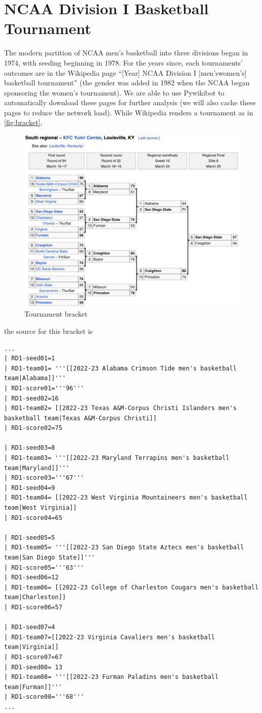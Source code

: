\documentclass{article}
\begin{document}
\section{NCAA Division I Basketball Tournament}
The modern partition of NCAA men's basketball into three divisions began in 1974, with seeding beginning in 1978.  For the years since, each tournaments' outcomes are in the Wikipedia page ``[Year] NCAA Division I [men's\textbar women's] basketball tournament'' (the gender was added in 1982 when the NCAA began sponsoring the women's tournament).  We are able to use Pywikibot\cite{pywikibot} to automatically download these pages for further analysis (we will also cache these pages to reduce the network load).  While Wikipedia renders a tournament as in \autoref{fig:bracket},
\begin{figure}
\includegraphics[width=\linewidth]{2023bracket}
\caption{\label{fig:bracket}Tournament bracket}
\end{figure}
the source for this bracket is
\begin{lstlisting}[basicstyle=\scriptsize,breaklines=true]
...
| RD1-seed01=1
| RD1-team01= '''[[2022-23 Alabama Crimson Tide men's basketball team|Alabama]]'''
| RD1-score01='''96'''
| RD1-seed02=16
| RD1-team02= [[2022-23 Texas A&M-Corpus Christi Islanders men's basketball team|Texas A&M-Corpus Christi]]
| RD1-score02=75
 
| RD1-seed03=8
| RD1-team03= '''[[2022-23 Maryland Terrapins men's basketball team|Maryland]]'''
| RD1-score03='''67'''
| RD1-seed04=9
| RD1-team04= [[2022-23 West Virginia Mountaineers men's basketball team|West Virginia]]
| RD1-score04=65
 
| RD1-seed05=5
| RD1-team05= '''[[2022-23 San Diego State Aztecs men's basketball team|San Diego State]]'''
| RD1-score05='''63'''
| RD1-seed06=12
| RD1-team06= [[2022-23 College of Charleston Cougars men's basketball team|Charleston]]
| RD1-score06=57
 
| RD1-seed07=4
| RD1-team07=[[2022-23 Virginia Cavaliers men's basketball team|Virginia]]
| RD1-score07=67
| RD1-seed08= 13
| RD1-team08= '''[[2022-23 Furman Paladins men's basketball team|Furman]]'''
| RD1-score08='''68'''
...
\end{lstlisting}
\end{document}
